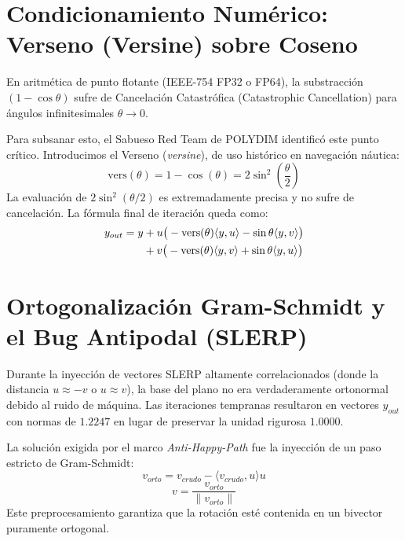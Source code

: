 \section{Condicionamiento Numérico: Verseno (Versine) sobre Coseno}
\begin{lemma}
En aritmética de punto flotante (IEEE-754 FP32 o FP64), la substracción $(1 - \cos\theta)$ sufre de Cancelación Catastrófica (Catastrophic Cancellation) para ángulos infinitesimales $\theta \to 0$.
\end{lemma}
Para subsanar esto, el Sabueso Red Team de POLYDIM identificó este punto crítico. Introducimos el Verseno (\textit{versine}), de uso histórico en navegación náutica:
\begin{equation}
    \text{vers}(\theta) = 1 - \cos(\theta) = 2 \sin^2\left(\frac{\theta}{2}\right)
\end{equation}
La evaluación de $2 \sin^2(\theta/2)$ es extremadamente precisa y no sufre de cancelación. La fórmula final de iteración queda como:
\begin{align}
    y_{out} = y &+ u \big( -\text{vers}(\theta) \langle y, u \rangle - \sin\theta \langle y, v \rangle \big) \notag \\
                &+ v \big( -\text{vers}(\theta) \langle y, v \rangle + \sin\theta \langle y, u \rangle \big)
\end{align}

\section{Ortogonalización Gram-Schmidt y el Bug Antipodal (SLERP)}
Durante la inyección de vectores SLERP altamente correlacionados (donde la distancia $u \approx -v$ o $u \approx v$), la base del plano no era verdaderamente ortonormal debido al ruido de máquina. Las iteraciones tempranas resultaron en vectores $y_{out}$ con normas de $1.2247$ en lugar de preservar la unidad rigurosa $1.0000$.

La solución exigida por el marco \textit{Anti-Happy-Path} fue la inyección de un paso estricto de Gram-Schmidt:
\begin{equation}
    v_{orto} = v_{crudo} - \langle v_{crudo}, u \rangle u
\end{equation}
\begin{equation}
    v = \frac{v_{orto}}{\|v_{orto}\|}
\end{equation}
Este preprocesamiento garantiza que la rotación esté contenida en un bivector puramente ortogonal.

